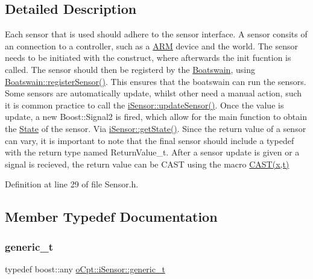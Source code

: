 \subsection{Detailed Description}
Each sensor that is used should adhere to the sensor interface. A sensor consits of an connection to a controller, such as a \hyperlink{classo_cpt_1_1_a_r_m}{A\+RM} device and the world. The sensor needs to be initiated with the construct, where afterwards the init fucntion is called. The sensor should then be registerd by the \hyperlink{classo_cpt_1_1_boatswain}{Boatswain}, using \hyperlink{classo_cpt_1_1_boatswain_ab36071db5e3f8a0db0053b5553e508f0}{Boatswain\+::register\+Sensor()}. This ensures that the boatswain can run the sensors. Some sensors are automatically update, whilst other need a manual action, such it is common practice to call the \hyperlink{classo_cpt_1_1i_sensor_aa55bc04979e4852989af2bd4f64e70bc}{i\+Sensor\+::update\+Sensor()}. Once the value is update, a new Boost\+::\+Signal2 is fired, which allow for the main function to obtain the \hyperlink{structo_cpt_1_1i_sensor_1_1_state}{State} of the sensor. Via \hyperlink{classo_cpt_1_1i_sensor_a9ab760449e01c754c30374641c51ac66}{i\+Sensor\+::get\+State()}. Since the return value of a sensor can vary, it is important to note that the final sensor should include a typedef with the return type named Return\+Value\+\_\+t. After a sensor update is given or a signal is recieved, the return value can be C\+A\+ST using the macro \hyperlink{_sensor_8h_a1edee5ac6b15c590def9ae3e0bfa8d48}{C\+A\+S\+T(x,t)} 

Definition at line 29 of file Sensor.\+h.



\subsection{Member Typedef Documentation}
\hypertarget{classo_cpt_1_1i_sensor_a8c83eafe5bdc0074a8c2c405023ee204}{}\label{classo_cpt_1_1i_sensor_a8c83eafe5bdc0074a8c2c405023ee204} 
\subsubsection{\texorpdfstring{generic\+\_\+t}{generic\_t}}
{\footnotesize\ttfamily typedef boost\+::any \hyperlink{classo_cpt_1_1i_sensor_a8c83eafe5bdc0074a8c2c405023ee204}{o\+Cpt\+::i\+Sensor\+::generic\+\_\+t}}



